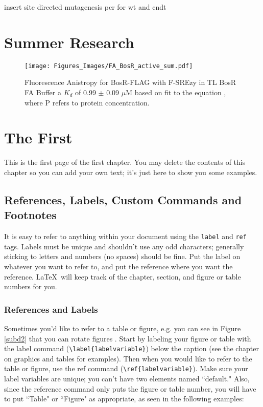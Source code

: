 \documentclass[12pt,twoside]{reedthesis}
\begin{document}
   insert site directed mutagenesis pcr for wt and cndt
\appendix
\chapter{Summer Research} 
   
           	\begin{figure}[h]
           		\centering
           		\texttt{[image: Figures\_Images/FA\_BosR\_active\_sum.pdf]}
           		\caption[Determining DNA Activity of BosR-FLAG by Fluorescence Anistropy]{Fluorescence Anistropy for BosR-FLAG with F-SREzy in TL BosR FA Buffer  a $K_{d}$ of 0.99 $\pm$ 0.09 $\mu$M based on fit to the equation \FAstdfit , where P refers to protein concentration.}
           		\label{BosRFLAGFAactive}
           	\end{figure}
           	
           		
    \chapter{The First}
    	This is the first page of the first chapter. You may delete the contents of this chapter so you can add your own text; it's just here to show you some examples. 
	
\section{References, Labels, Custom Commands and Footnotes}
It is easy to refer to anything within your document using the \texttt{label} and \texttt{ref} tags.  Labels must be unique and shouldn't use any odd characters; generally sticking to letters and numbers (no spaces) should be fine. Put the label on whatever you want to refer to, and put the reference where you want the reference. \LaTeX\ will keep track of the chapter, section, and figure or table numbers for you. 

\subsection{References and Labels}
Sometimes you'd like to refer to a table or figure, e.g. you can see in Figure \ref{subd2} that you can rotate figures . Start by labeling your figure or table with the label command (\verb=\label{labelvariable}=) below the caption (see the chapter on graphics and tables for examples). Then when you would like to refer to the table or figure, use the ref command (\verb=\ref{labelvariable}=). Make sure your label variables are unique; you can't have two elements named ``default." Also, since the reference command only puts the figure or table number, you will have to put  ``Table" or ``Figure" as appropriate, as seen in the following examples:
\end{document}
